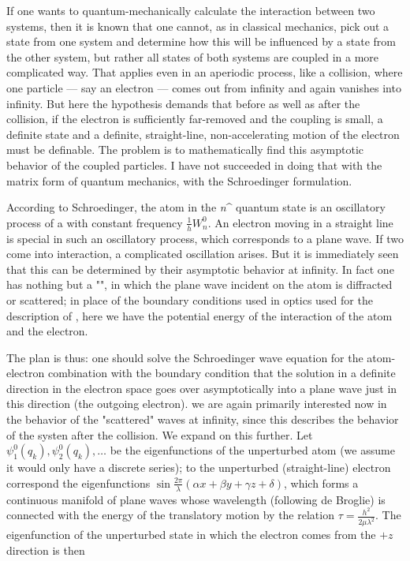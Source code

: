 {If one wants to quantum-mechanically calculate the interaction between two systems, then it is known that one cannot, as in classical mechanics, pick out a state from one system and determine how this will be influenced by a state from the other system, but rather all states of both systems are coupled in a more complicated way. That applies even in an aperiodic process, like a collision, where one particle — say an electron — comes out from infinity and again vanishes into infinity. But here the hypothesis demands that before as well as after the collision, if the electron is sufficiently far-removed and the coupling is small, a definite state and a definite, straight-line, non-accelerating motion of the electron must be definable. The problem is to mathematically find this asymptotic behavior of the coupled particles. I have not succeeded in doing that with the matrix form of quantum mechanics,  with the Schroedinger formulation.

	According to Schroedinger, the atom in the \textit{n}^ quantum state is an oscillatory process of a  with constant frequency $\frac{1}{h}W^0_n$. An electron moving in a straight line is special in such an oscillatory process, which corresponds to a plane wave. If two come into interaction, a complicated oscillation arises. But it is immediately seen that this can be determined by their asymptotic behavior at infinity. In fact one has nothing but a "", in which the plane wave incident on the  atom is diffracted or scattered; in place of the boundary conditions used in optics used for the description of , here we have the potential energy of the interaction of the atom and the electron.
	
The plan is thus: one should solve the Schroedinger wave equation for the atom-electron combination with the boundary condition that the solution in a definite direction in the electron space goes over asymptotically into a plane wave just in this direction (the outgoing electron).   we are again primarily interested now in the behavior of the "scattered" waves at infinity, since this describes the behavior of the systen after the collision. We expand on this further. Let $\psi^0_1(q_k), \psi^0_2(q_k), \dots$ be the eigenfunctions of the unperturbed atom (we assume it would only have a discrete series); to the unperturbed (straight-line) electron correspond the eigenfunctions $\sin{\frac{2\pi}{\lambda}(\alpha x + \beta y + \gamma z + \delta)}$, which forms a continuous manifold of plane waves whose wavelength (following de Broglie) is connected with the energy of the translatory motion by the relation $\tau = \frac{h^2}{2\mu \lambda^2}$. The eigenfunction of the unperturbed state in which the electron comes from the $+z$ direction is then

}
